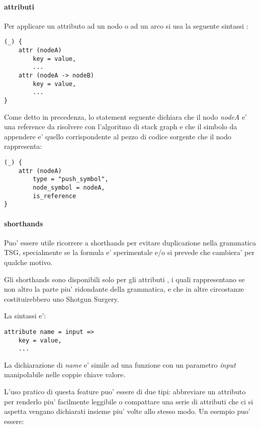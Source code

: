 \paragraph{attributi}

Per applicare un attributo ad un nodo o ad un arco si usa la seguente sintassi \cite{TreeSitterGraphReferenceAttributes}:

\begin{Verbatim}[samepage=true]
(_) {
    attr (nodeA)
        key = value,
        ...
    attr (nodeA -> nodeB)
        key = value,
        ...
}
\end{Verbatim}

Come detto in precedenza, lo statement seguente dichiara che il nodo \emph{nodeA} e' una reference da risolvere con l'algoritmo di stack graph e che il simbolo da appendere e' quello corrispondente al pezzo di codice sorgente che il nodo rappresenta:

\begin{Verbatim}[samepage=true]
(_) {
    attr (nodeA)
        type = "push_symbol",
        node_symbol = nodeA,
        is_reference
}
\end{Verbatim}

\paragraph{shorthands}
Puo' essere utile ricorrere a shorthands per evitare duplicazione nella grammatica TSG, specialmente se la formula e' sperimentale e/o si prevede che cambiera' per qualche motivo.

Gli shorthands sono disponibili solo per gli attributi \cite{TreeSitterGraphReferenceAttributeShorthands}, i quali rappresentano se non altro la parte piu' ridondante della grammatica, e che in altre circostanze costituirebbero uno Shotgun Surgery.

La sintassi e':

\begin{Verbatim}[samepage=true]
attribute name = input =>
    key = value,
    ...
\end{Verbatim}

La dichiarazione di \emph{name} e' simile ad una funzione con un parametro \emph{input} manipolabile nelle coppie chiave valore.

L'uso pratico di questa feature puo' essere di due tipi: abbreviare un attributo per renderlo piu' facilmente leggibile o compattare una serie di attributi che ci si aspetta vengano dichiarati insieme piu' volte allo stesso modo. Un esempio puo' essere:

